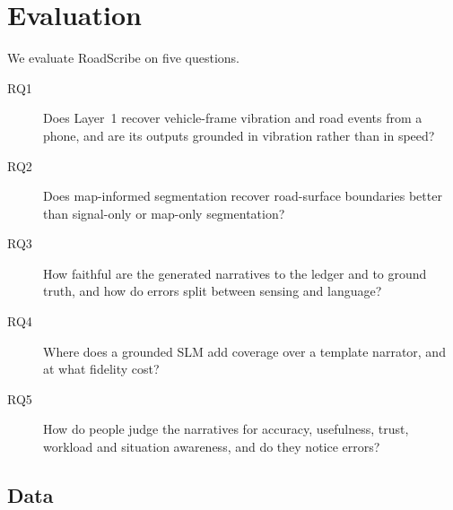 \providecommand{\R}{\mathbb{R}}
\providecommand{\ind}{\mathbf{1}}
\providecommand{\TBD}[1][]{\textcolor{red}{[TBD#1]}}

\section{Evaluation}
\label{sec:eval}

We evaluate RoadScribe on five questions.
\begin{description}
\item[RQ1] Does Layer~1 recover vehicle-frame vibration and road events from a phone, and are its outputs grounded in vibration rather than in speed?
\item[RQ2] Does map-informed segmentation recover road-surface boundaries better than signal-only or map-only segmentation?
\item[RQ3] How faithful are the generated narratives to the ledger and to ground truth, and how do errors split between sensing and language?
\item[RQ4] Where does a grounded SLM add coverage over a template narrator, and at what fidelity cost?
\item[RQ5] How do people judge the narratives for accuracy, usefulness, trust, workload and situation awareness, and do they notice errors?
\end{description}

\subsection{Data}
\label{sec:data}

